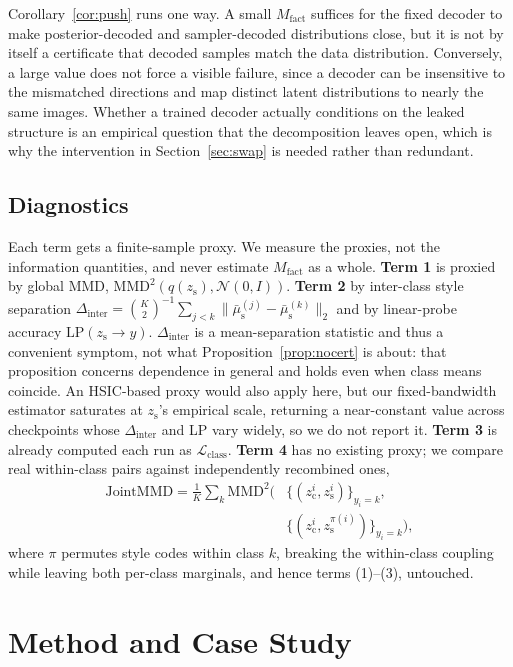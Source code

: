 \documentclass[letterpaper]{article}
\newcommand{\zc}{z_{\mathrm{c}}}
\newcommand{\zs}{z_{\mathrm{s}}}
\newcommand{\mus}{\mu_{\mathrm{s}}}
\newcommand{\MMD}{\mathrm{MMD}}
\newcommand{\Dinter}{\Delta_{\mathrm{inter}}}
\begin{document}
Corollary~\ref{cor:push} runs one way. A small $M_{\mathrm{fact}}$ suffices
for the fixed decoder to make posterior-decoded and sampler-decoded
distributions close, but it is not by itself a certificate that decoded
samples match the data distribution. Conversely, a large value does not force
a visible failure, since a decoder can be insensitive to the mismatched
directions and map distinct latent distributions to nearly the same images.
Whether a trained decoder actually conditions on the leaked structure is an
empirical question that
the decomposition leaves open, which is why the intervention in
Section~\ref{sec:swap} is needed rather than redundant.

\subsection{Diagnostics}
\label{sec:diag}

Each term gets a finite-sample proxy. We measure the proxies, not the
information quantities, and never estimate $M_{\mathrm{fact}}$ as a whole.
\textbf{Term 1} is proxied by global MMD, $\MMD^2(q(\zs),\mathcal N(0,I))$.
\textbf{Term 2} by inter-class style separation
$\Dinter=\binom{K}{2}^{-1}\sum_{j<k}\|\bar\mus^{(j)}-\bar\mus^{(k)}\|_2$ and
by linear-probe accuracy $\mathrm{LP}(\zs\to y)$. $\Dinter$ is a
mean-separation statistic and thus a convenient symptom, not what
Proposition~\ref{prop:nocert} is about: that proposition concerns dependence
in general and holds even when class means coincide. An HSIC-based proxy
would also apply here, but our fixed-bandwidth estimator saturates at $\zs$'s
empirical scale, returning a near-constant value across checkpoints whose
$\Dinter$ and LP vary widely, so we do not report it. \textbf{Term 3} is
already computed each run as $\mathcal L_{\mathrm{class}}$. \textbf{Term 4}
has no existing proxy; we compare real within-class pairs against
independently recombined ones,
\begin{equation}
\begin{split}
\mathrm{JointMMD} = \tfrac1K\textstyle\sum_k \MMD^2\bigl(&\{(\zc^i,\zs^i)\}_{y_i=k},\\
&\{(\zc^i,\zs^{\pi(i)})\}_{y_i=k}\bigr),
\end{split}
\label{eq:jmmd}
\end{equation}
where $\pi$ permutes style codes within class $k$, breaking the within-class
coupling while leaving both per-class marginals, and hence terms (1)--(3),
untouched.

\section{Method and Case Study}
\label{sec:method}
\end{document}
